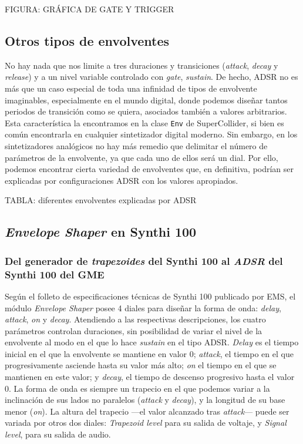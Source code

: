 FIGURA: GRÁFICA DE GATE Y TRIGGER

\subsection{Otros tipos de envolventes}

No hay nada que nos limite a tres duraciones y transiciones (\textit{attack}, \textit{decay} y \textit{release}) y a un nivel variable controlado con \textit{gate}, \textit{sustain}. De hecho, ADSR no es más que un caso especial de toda una infinidad de tipos de envolvente imaginables, especialmente en el mundo digital, donde podemos diseñar tantos periodos de transición como se quiera, asociados también a valores arbitrarios. Esta característica la encontramos en la clase \texttt{Env} de SuperCollider, si bien es común encontrarla en cualquier sintetizador digital moderno. Sin embargo, en los sintetizadores analógicos no hay más remedio que delimitar el número de parámetros de la envolvente, ya que cada uno de ellos será un dial. Por ello, podemos encontrar cierta variedad de envolventes que, en definitiva, podrían ser explicadas por configuraciones ADSR con los valores apropiados. 

TABLA: diferentes envolventes explicadas por ADSR

\subsection{\textit{Envelope Shaper} en Synthi 100}

\subsubsection{Del generador de \textit{trapezoides} del Synthi 100 al \textit{ADSR} del Synthi 100 del GME}

Según el folleto de especificaciones técnicas de Synthi 100 publicado por EMS, el módulo \textit{Envelope Shaper} posee 4 diales para diseñar la forma de onda: \textit{delay}, \textit{attack}, \textit{on} y \textit{decay}. Atendiendo a las respectivas descripciones, los cuatro parámetros controlan duraciones, sin posibilidad de variar el nivel de la envolvente al modo en el que lo hace \textit{sustain} en el tipo ADSR. \textit{Delay} es el tiempo inicial en el que la envolvente se mantiene en valor 0; \textit{attack}, el tiempo en el que progresivamente asciende hasta su valor más alto; \textit{on} el tiempo en el que se mantienen en este valor; y \textit{decay}, el tiempo de descenso progresivo hasta el valor 0. La forma de onda es siempre un trapecio en el que podemos variar a la inclinación de sus lados no paralelos (\textit{attack} y \textit{decay}), y la longitud de su base menor (\textit{on}). La altura del trapecio ---el valor alcanzado tras \textit{attack}--- puede ser variada por otros dos diales: \textit{Trapezoid level} para su salida de voltaje, y \textit{Signal level}, para su salida de audio.


